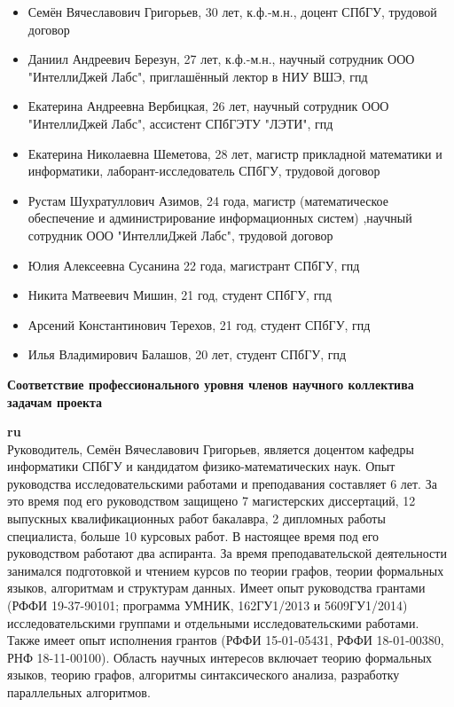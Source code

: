 \documentclass[12pt]{article}  %
\theoremstyle{remark}
\begin{document}
\begin{itemize}
  \item Семён Вячеславович Григорьев, 30 лет, к.ф.-м.н., доцент СПбГУ, трудовой договор
  \item Даниил Андреевич Березун, 27 лет, к.ф.-м.н., научный сотрудник ООО "ИнтеллиДжей Лабс", приглашённый лектор в НИУ ВШЭ, гпд
  \item Екатерина Андреевна Вербицкая, 26 лет, научный сотрудник ООО "ИнтеллиДжей Лабс", ассистент СПбГЭТУ "ЛЭТИ", гпд
  \item Екатерина Николаевна Шеметова, 28 лет, магистр прикладной математики и информатики, лаборант-исследователь СПбГУ, трудовой договор
  \item Рустам Шухратуллович Азимов, 24 года, магистр (математическое обеспечение и администрирование информационных систем) ,научный сотрудник ООО "ИнтеллиДжей Лабс", трудовой договор
  \item Юлия Алексеевна Сусанина 22 года, магистрант СПбГУ, гпд
  \item Никита Матвеевич Мишин, 21 год, студент СПбГУ, гпд
  \item Арсений Константинович Терехов, 21 год, студент СПбГУ, гпд
  \item Илья Владимирович Балашов, 20 лет, студент СПбГУ, гпд
\end{itemize}



\textbf{Соответствие профессионального уровня членов научного коллектива задачам проекта}

\textbf{ru}\\
%
Руководитель, Семён Вячеславович Григорьев, является доцентом кафедры информатики СПбГУ и кандидатом физико-математических наук. Опыт руководства исследовательскими работами и преподавания составляет 6 лет. За это время под его руководством защищено 7 магистерских диссертаций, 12 выпускных квалификационных работ бакалавра, 2 дипломных работы специалиста, больше 10 курсовых работ. В настоящее время под его руководством работают два аспиранта. За время преподавательской деятельности занимался подготовкой и чтением курсов по теории графов, теории формальных языков, алгоритмам и структурам данных. Имеет опыт руководства грантами (РФФИ 19-37-90101; программа УМНИК, 162ГУ1/2013 и 5609ГУ1/2014) исследовательскими группами и отдельными исследовательскими работами. Также имеет опыт исполнения грантов (РФФИ 15-01-05431, РФФИ 18-01-00380, РНФ 18-11-00100). Область научных интересов включает теорию формальных языков, теорию графов, алгоритмы синтаксического анализа, разработку параллельных алгоритмов.
\end{document}

